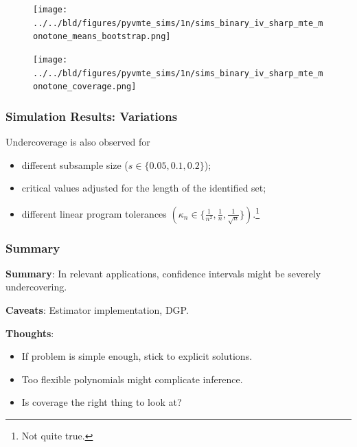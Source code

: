 \documentclass[11pt, aspectratio=169]{beamer}
\begin{document}
\begin{frame}

    \begin{figure}
        \texttt{[image: ../../bld/figures/pyvmte\_sims/1n/sims\_binary\_iv\_sharp\_mte\_monotone\_means\_bootstrap.png]}
    \end{figure}

\end{frame}

\begin{frame}

    \begin{figure}
        \texttt{[image: ../../bld/figures/pyvmte\_sims/1n/sims\_binary\_iv\_sharp\_mte\_monotone\_coverage.png]}
    \end{figure}

\end{frame}

\begin{frame}
    \frametitle{Simulation Results: Variations}
    Undercoverage is also observed for
    \begin{itemize}
        \item different subsample size ($s\in\{0.05, 0.1, 0.2\}$);
        \item critical values adjusted for the length of the identified set;
        \item different linear program tolerances $(\kappa_n \in \{\frac{1}{n^2}, \frac{1}{n}, \frac{1}{\sqrt{n}}\})$.\footnote{
            Not quite true.
        }
    \end{itemize}

\end{frame}

\begin{frame}
    \frametitle{Summary}

    \textbf{Summary}: In relevant applications, confidence intervals might be severely undercovering.

    \vspace{0.5cm}

    \textbf{Caveats}: Estimator implementation, DGP\@.

    \vspace{0.5cm}

    \pause

    \textbf{Thoughts}:
    \begin{itemize}
        \item If problem is simple enough, stick to explicit solutions.
        \item Too flexible polynomials might complicate inference.
        \item Is coverage the right thing to look at?
    \end{itemize}

\end{frame}
\end{document}
